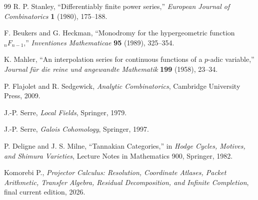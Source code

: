\documentclass[11pt]{article}
\theoremstyle{definition}
\theoremstyle{remark}
\begin{document}
\begin{thebibliography}{99}
R. P. Stanley, ``Differentiably finite power series,'' \emph{European Journal of Combinatorics} \textbf{1} (1980), 175--188.

F. Beukers and G. Heckman, ``Monodromy for the hypergeometric function \({}_nF_{n-1}\),'' \emph{Inventiones Mathematicae} \textbf{95} (1989), 325--354.

K. Mahler, ``An interpolation series for continuous functions of a \(p\)-adic variable,'' \emph{Journal f\"ur die reine und angewandte Mathematik} \textbf{199} (1958), 23--34.

P. Flajolet and R. Sedgewick, \emph{Analytic Combinatorics}, Cambridge University Press, 2009.

J.-P. Serre, \emph{Local Fields}, Springer, 1979.

J.-P. Serre, \emph{Galois Cohomology}, Springer, 1997.

P. Deligne and J. S. Milne, ``Tannakian Categories,'' in \emph{Hodge Cycles, Motives, and Shimura Varieties}, Lecture Notes in Mathematics 900, Springer, 1982.

Komorebi P., \emph{Projector Calculus: Resolution, Coordinate Atlases, Packet Arithmetic, Transfer Algebra, Residual Decomposition, and Infinite Completion}, final current edition, 2026.

\end{thebibliography}
\end{document}
